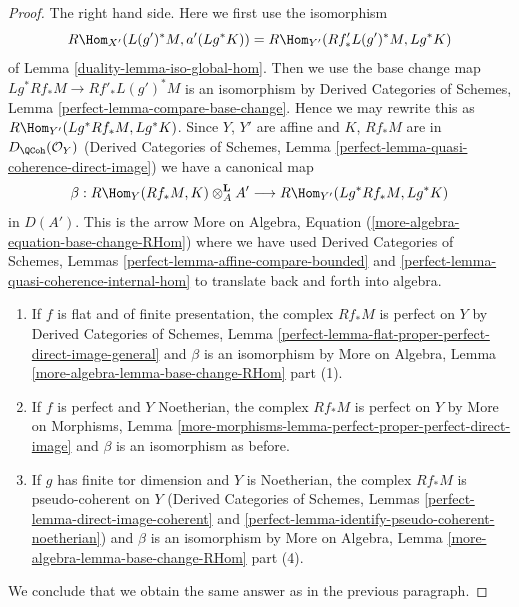 \begin{proof}
\medskip\noindent
The right hand side. Here we first use the isomorphism
$$
R\Hom_{X'}(L(g')^*M, a'(Lg^*K)) = R\Hom_{Y'}(Rf'_*L(g')^*M, Lg^*K)
$$
of Lemma \ref{duality-lemma-iso-global-hom}. Then we use the base change
map $Lg^*Rf_*M \to Rf'_*L(g')^*M$ is an isomorphism by
Derived Categories of Schemes, Lemma \ref{perfect-lemma-compare-base-change}.
Hence we may rewrite this as $R\Hom_{Y'}(Lg^*Rf_*M, Lg^*K)$.
Since $Y$, $Y'$ are affine and $K$, $Rf_*M$ are in $D_\QCoh(\mathcal{O}_Y)$
(Derived Categories of Schemes, Lemma
\ref{perfect-lemma-quasi-coherence-direct-image})
we have a canonical map
$$
\beta :
R\Hom_Y(Rf_*M, K) \otimes^\mathbf{L}_A A'
\longrightarrow
R\Hom_{Y'}(Lg^*Rf_*M, Lg^*K)
$$
in $D(A')$. This is the arrow
More on Algebra, Equation (\ref{more-algebra-equation-base-change-RHom})
where we have used Derived Categories of Schemes, Lemmas
\ref{perfect-lemma-affine-compare-bounded} and
\ref{perfect-lemma-quasi-coherence-internal-hom}
to translate back and forth into algebra.
\begin{enumerate}
\item If $f$ is flat and of finite presentation, the complex $Rf_*M$
is perfect on $Y$ by Derived Categories of Schemes, Lemma
\ref{perfect-lemma-flat-proper-perfect-direct-image-general}
and $\beta$ is an isomorphism by
More on Algebra, Lemma \ref{more-algebra-lemma-base-change-RHom} part (1).
\item If $f$ is perfect and $Y$ Noetherian, the complex $Rf_*M$
is perfect on $Y$ by More on Morphisms, Lemma
\ref{more-morphisms-lemma-perfect-proper-perfect-direct-image}
and $\beta$ is an isomorphism as before.
\item If $g$ has finite tor dimension and $Y$ is Noetherian,
the complex $Rf_*M$ is pseudo-coherent on $Y$
(Derived Categories of Schemes, Lemmas
\ref{perfect-lemma-direct-image-coherent} and
\ref{perfect-lemma-identify-pseudo-coherent-noetherian})
and $\beta$ is an isomorphism by
More on Algebra, Lemma \ref{more-algebra-lemma-base-change-RHom} part (4).
\end{enumerate}
We conclude that we obtain the same answer as in the previous paragraph.


\end{proof}
